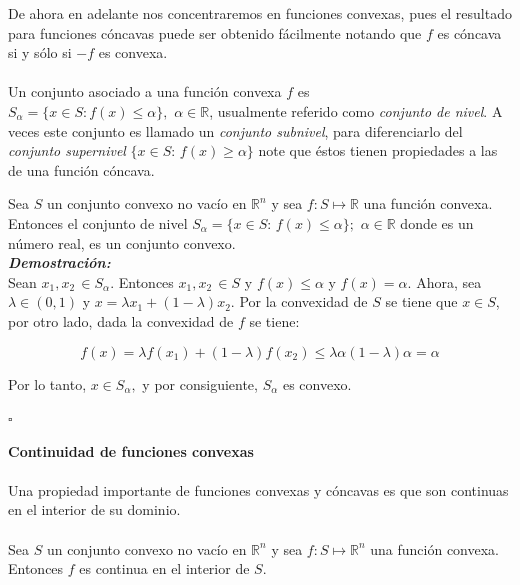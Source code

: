 De ahora en adelante nos concentraremos en funciones convexas, pues el resultado para funciones c\'oncavas puede ser obtenido f\'acilmente
notando que $f$ es c\'oncava si y s\'olo si $-f$ es convexa.\\ \\


Un conjunto asociado a una funci\'on convexa $f$ es $S_{\alpha} = \{x \in S: f(x) \leqslant \alpha \}, \,\, \alpha \in \mathbb{R}$, 
usualmente referido como {\it conjunto de nivel}. A veces este conjunto es llamado un {\it conjunto subnivel}, para
diferenciarlo del {\it conjunto supernivel} $\{ x \in S:\,  f(x) \geqslant \alpha \}$ note que \'estos tienen propiedades a 
las de una funci\'on c\'oncava. \\ \medskip

{\teorema Sea $S$ un conjunto convexo no vac\'io en $\mathbb{R}^n$ y sea $f: S \longmapsto \mathbb{R}$ una funci\'on convexa. Entonces el 
conjunto de nivel $S_{\alpha} = \{ x \in S:\, f(x) \leqslant\alpha \}; \,\, \alpha \in \mathbb{R}$ donde es un n\'umero real, es un 
conjunto convexo. \label{nivel-convx} }\\ 

\textbf{\itshape Demostraci\'on:}\\
Sean $x_1, x_2\, \in S_{\alpha}.$ Entonces $x_1, x_2\, \in S$  y  $f(x) \leqslant \alpha$  y  $f(x) = \alpha$. Ahora, sea $\lambda \in (0, 1)$
y $x = \lambda x_1 + (1 - \lambda)x_2$. Por la convexidad de $S$ se tiene que $x \in S$, por otro lado, dada la convexidad de $f$ se tiene:

$$f(x) = \lambda f(x_1) + (1 - \lambda) f(x_2) \leqslant \lambda \alpha (1 - \lambda)\alpha = \alpha$$

Por lo tanto, $x \in S_{\alpha},$ y por consiguiente, $S_{\alpha}$ es convexo.
\begin{flushright}
   $\square$
\end{flushright}

\medskip

\textbf{Continuidad de funciones convexas}\\\\

Una propiedad importante de funciones convexas y c\'oncavas es que son continuas en el interior de su dominio.\\ \\

{\teorema Sea $S$ un conjunto convexo no vac\'io en $\mathbb{R}^n$ y sea $f: S \longmapsto \mathbb{R}^n$ una funci\'on convexa. Entonces $f$
es continua en el interior de $S.$ \label{fconvex-continuos} }\\

